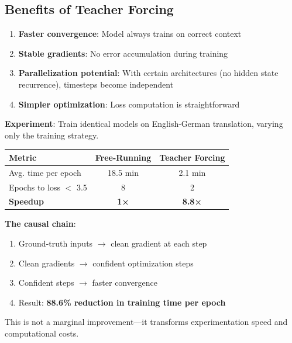 \documentclass{article}
\begin{document}
\subsection{Benefits of Teacher Forcing}

\begin{enumerate}
\item \textbf{Faster convergence}: Model always trains on correct context
\item \textbf{Stable gradients}: No error accumulation during training
\item \textbf{Parallelization potential}: With certain architectures (no hidden state recurrence), timesteps become independent
\item \textbf{Simpler optimization}: Loss computation is straightforward
\end{enumerate}

\begin{tcolorbox}[colback=green!5!white, colframe=green!50!black, title=Empirical Impact: Teacher Forcing]
\textbf{Experiment}: Train identical models on English-German translation, varying only the training strategy.

\vspace{0.3cm}
\begin{center}
\begin{tabular}{|l|c|c|}
\hline
\textbf{Metric} & \textbf{Free-Running} & \textbf{Teacher Forcing} \\
\hline
Avg. time per epoch & 18.5 min & 2.1 min \\
\hline
Epochs to loss $<$ 3.5 & 8 & 2 \\
\hline
\textbf{Speedup} & \textbf{1×} & \textbf{8.8×} \\
\hline
\end{tabular}
\end{center}

\vspace{0.3cm}
\textbf{The causal chain}:
\begin{enumerate}
\item Ground-truth inputs $\rightarrow$ clean gradient at each step
\item Clean gradients $\rightarrow$ confident optimization steps  
\item Confident steps $\rightarrow$ faster convergence
\item Result: \textbf{88.6\% reduction in training time per epoch}
\end{enumerate}

This is not a marginal improvement—it transforms experimentation speed and computational costs.
\end{tcolorbox}
\end{document}
